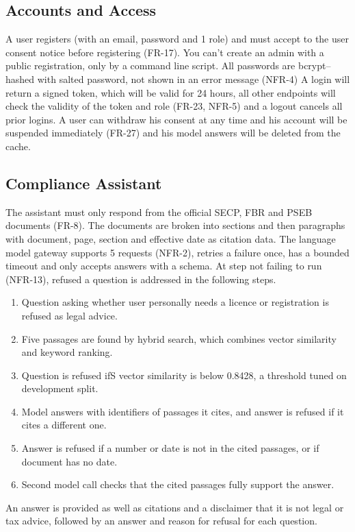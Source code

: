 \documentclass{FastFyp}
\begin{document}
\subsection{Accounts and Access}
A user registers (with an email, password and 1 role) and must accept to the user consent notice before registering (FR-17). You can't create an admin with a public registration, only by a command line script. All passwords are bcrypt–hashed with salted password, not shown in an error message (NFR-4) A login will return a signed token, which will be valid for 24 hours, all other endpoints will check the validity of the token and role (FR-23, NFR-5) and a logout cancels all prior logins. A user can withdraw his consent at any time and his account will be suspended immediately (FR-27) and his model answers will be deleted from the cache.

\subsection{Compliance Assistant}
The assistant must only respond from the official SECP, FBR and PSEB documents (FR-8). The documents are broken into sections and then paragraphs with document, page, section and effective date as citation data. The language model gateway supports 5 requests (NFR-2), retries a failure once, has a bounded timeout and only accepts answers with a schema. At step not failing to run (NFR-13), refused a question is addressed in the following steps.
\begin{enumerate}
\item Question asking whether user personally needs a licence or registration is refused as legal advice.
\item Five passages are found by hybrid search, which combines vector similarity and keyword ranking.
\item Question is refused ifS vector similarity is below 0.8428, a threshold tuned on development split.
\item Model answers with identifiers of passages it cites, and answer is refused if it cites a different one.
\item Answer is refused if a number or date is not in the cited passages, or if document has no date.
\item Second model call checks that the cited passages fully support the answer.
\end{enumerate}
An answer is provided as well as citations and a disclaimer that it is not legal or tax advice, followed by an answer and reason for refusal for each question.
\end{document}

